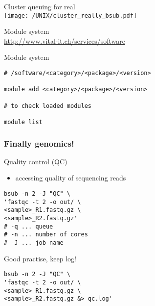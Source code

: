 \documentclass[xcolor=dvipsnames]{beamer}
\begin{document}
\begin{frame}
	\begin{center}
		\Huge
		Cluster queuing for real\\
		\vspace{1cm}
		\texttt{[image: /UNIX/cluster\_really\_bsub.pdf]}
	\end{center}
\end{frame}

\begin{frame}
	\begin{center}
		\Huge
		Module system\\
		\vspace{1cm}
		\Large
		\url{http://www.vital-it.ch/services/software}
	\end{center}
\end{frame}

\begin{frame}[fragile]
\begin{center}
\Huge
Module system\\
\vspace{1cm}
\large
\begin{verbatim}
# /software/<category>/<package>/<version>

module add <category>/<package>/<version>

# to check loaded modules

module list
\end{verbatim}
\end{center}
\end{frame}

\begin{frame}
	\frametitle{Finally genomics!}
	Quality control (QC)
	\large
	\begin{itemize}
		\item accessing quality of sequencing reads
	\end{itemize}
\end{frame}

\begin{frame}[fragile]
\LARGE
\begin{verbatim}
bsub -n 2 -J "QC" \
'fastqc -t 2 -o out/ \
<sample>_R1.fastq.gz \
<sample>_R2.fastq.gz'
# -q ... queue
# -n ... number of cores
# -J ... job name
\end{verbatim}
\end{frame}

\begin{frame}[fragile]
Good practise, keep log!
\LARGE
\begin{verbatim}
bsub -n 2 -J "QC" \
'fastqc -t 2 -o out/ \
<sample>_R1.fastq.gz \
<sample>_R2.fastq.gz &> qc.log'
\end{verbatim}
\end{frame}
\end{document}
